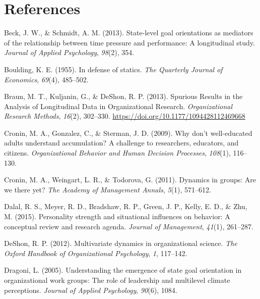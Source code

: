 \documentclass[english,,man]{apa6}
\begin{document}
\newpage

\hypertarget{references}{%
\section{References}\label{references}}

\setlength{\parindent}{-0.5in}
\setlength{\leftskip}{0.5in}

\hypertarget{refs}{}
\leavevmode\hypertarget{ref-beck2013state}{}%
Beck, J. W., \& Schmidt, A. M. (2013). State-level goal orientations as mediators of the relationship between time pressure and performance: A longitudinal study. \emph{Journal of Applied Psychology}, \emph{98}(2), 354.

\leavevmode\hypertarget{ref-boulding1955defense}{}%
Boulding, K. E. (1955). In defense of statics. \emph{The Quarterly Journal of Economics}, \emph{69}(4), 485--502.

\leavevmode\hypertarget{ref-braun_spurious_2013}{}%
Braun, M. T., Kuljanin, G., \& DeShon, R. P. (2013). Spurious Results in the Analysis of Longitudinal Data in Organizational Research. \emph{Organizational Research Methods}, \emph{16}(2), 302--330. \url{https://doi.org/10.1177/1094428112469668}

\leavevmode\hypertarget{ref-cronin2009don}{}%
Cronin, M. A., Gonzalez, C., \& Sterman, J. D. (2009). Why don't well-educated adults understand accumulation? A challenge to researchers, educators, and citizens. \emph{Organizational Behavior and Human Decision Processes}, \emph{108}(1), 116--130.

\leavevmode\hypertarget{ref-cronin_dynamics_2011}{}%
Cronin, M. A., Weingart, L. R., \& Todorova, G. (2011). Dynamics in groups: Are we there yet? \emph{The Academy of Management Annals}, \emph{5}(1), 571--612.

\leavevmode\hypertarget{ref-dalal2015personality}{}%
Dalal, R. S., Meyer, R. D., Bradshaw, R. P., Green, J. P., Kelly, E. D., \& Zhu, M. (2015). Personality strength and situational influences on behavior: A conceptual review and research agenda. \emph{Journal of Management}, \emph{41}(1), 261--287.

\leavevmode\hypertarget{ref-deshon_multivariate_2012}{}%
DeShon, R. P. (2012). Multivariate dynamics in organizational science. \emph{The Oxford Handbook of Organizational Psychology}, \emph{1}, 117--142.

\leavevmode\hypertarget{ref-dragoni2005understanding}{}%
Dragoni, L. (2005). Understanding the emergence of state goal orientation in organizational work groups: The role of leadership and multilevel climate perceptions. \emph{Journal of Applied Psychology}, \emph{90}(6), 1084.
\end{document}
